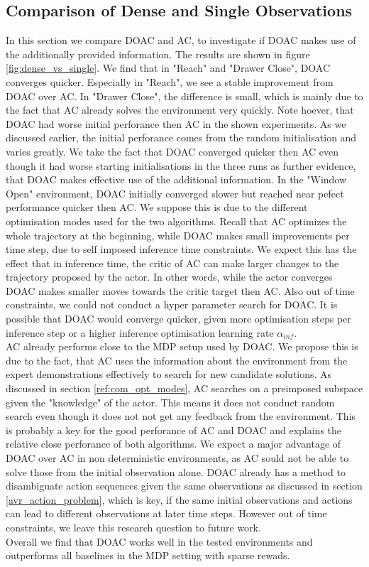 \subsection{Comparison of Dense and Single Observations}
\label{sec:comp_dense_sparse}
In this section we compare DOAC and AC, to investigate if DOAC makes use of the additionally provided information. The results are shown in figure \ref{fig:dense_vs_single}.
We find that in "Reach" and "Drawer Close", DOAC converges quicker. Especially in "Reach", we see a stable improvement from DOAC over AC. In "Drawer Close", the difference is 
small, which is mainly due to the fact that AC already solves the environment very quickly. Note hoever, that DOAC had worse initial perforance then AC in the shown experiments. 
As we discussed earlier, the initial perforance comes from the random initialisation and varies greatly. We take the fact that DOAC converged quicker then AC even though it had 
worse starting initialisations in the three runs as further evidence, that DOAC makes effective use of the additional information. In the "Window Open" environment, DOAC initially converged slower but 
reached near pefect performance quicker then AC. We suppose this is due to the different optimisation modes used for the two algorithms. Recall that AC optimizes the whole 
trajectory at the beginning, while DOAC makes small improvements per time step, due to self imposed inference time constraints. We expect this has the effect that in inference time, the critic of 
AC can make larger changes to the trajectory proposed by the actor. In other words, while the actor converges DOAC makes smaller moves towards the critic target then AC. Also out of time constraints, we could 
not conduct a hyper parameter search for DOAC. It is possible that DOAC would converge quicker, given more optimisation steps per inference step or a higher inference optimisation 
learning rate $\alpha_{inf}$.\\ 
AC already performs close to the MDP setup used by DOAC. We propose this is due to the fact, that AC uses the information about the environment 
from the expert demonstrations effectively to search for new candidate solutions. As discussed in section \ref{ref:com_opt_modes}, AC searches on a preimposed subspace given the "knowledge" of the 
actor. This means it does not conduct random search even though it does not not get any feedback from the environment. This is probably a key for the good perforance of AC and DOAC and explains 
the relative close perforance of both algorithms. We expect a major advantage of DOAC over AC in non deterministic environments, as AC sould not be able to solve those from the initial 
observation alone. DOAC already has a method to disambiguate action sequences given the same observations as discussed in section \ref{avr_action_problem}, which is key, if the same initial 
observations and actions can lead to different observations at later time steps. However out of time constraints, we leave this research question to future work.\\
Overall we find that DOAC works well in the tested environments and outperforms all baselines in the MDP setting with sparse rewads.

